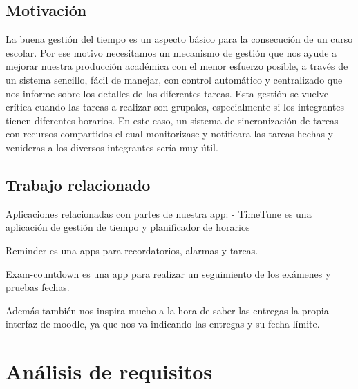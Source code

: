\documentclass[a4paper,openright,12pt]{article}
\begin{document}
\subsection{Motivación}
La buena gestión del tiempo es un aspecto básico para la consecución de un curso escolar. Por ese motivo necesitamos un mecanismo de gestión que nos ayude a mejorar nuestra producción académica con el menor esfuerzo posible, a través de un sistema sencillo, fácil de manejar, con control automático y centralizado que nos informe sobre los detalles de las diferentes tareas. 
Esta gestión se vuelve crítica cuando las tareas a realizar son grupales, especialmente si los integrantes tienen diferentes horarios. En este caso, un sistema de sincronización de tareas con recursos compartidos el cual monitorizase y notificara las tareas hechas y venideras a los diversos integrantes sería muy útil.
\subsection{Trabajo relacionado}
Aplicaciones relacionadas con partes de nuestra app:
- TimeTune es una aplicación de gestión de tiempo y planificador de horarios \cite{misc-url1}

Reminder es una apps para recordatorios, alarmas y tareas. \cite{misc-url2}

Exam-countdown es una app para realizar un seguimiento de los exámenes y pruebas fechas.\cite{misc-url3}

Además también nos inspira mucho a la hora de saber las entregas la propia interfaz de moodle, ya que nos va indicando las entregas y su fecha límite.

\section{Análisis de requisitos}

\end{document}
